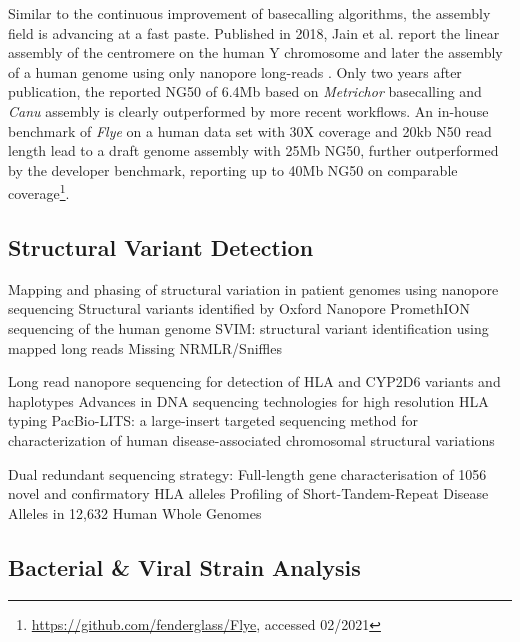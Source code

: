 Similar to the continuous improvement of basecalling algorithms, the assembly field is advancing at a fast paste.
Published in 2018, Jain et al. report the linear assembly of the centromere on the human Y chromosome and later the assembly of a human genome using only nanopore long-reads \cite{Jain2018, Jain2018b}.
Only two years after publication, the reported NG50 of 6.4Mb based on \textit{Metrichor} basecalling and \textit{Canu} assembly is clearly outperformed by more recent workflows.
An in-house benchmark of \textit{Flye} on a human data set with 30X coverage and 20kb N50 read length lead to a draft genome assembly with 25Mb NG50, further outperformed by the developer benchmark, reporting up to 40Mb NG50 on comparable coverage\footnote{\url{https://github.com/fenderglass/Flye}, accessed 02/2021}.




\subsection{Structural Variant Detection}
\label{subsec:state_of_art:sv}

Mapping and phasing of structural variation in patient genomes using nanopore sequencing \cite{Stancu2017}
Structural variants identified by Oxford Nanopore PromethION sequencing of the human genome \cite{Coster2019}
SVIM: structural variant identification using mapped long reads \cite{Heller2019}
Missing NRMLR/Sniffles \cite{Sedlazeck2018}

Long read nanopore sequencing for detection of HLA and CYP2D6 variants and haplotypes \cite{Ammar2015}
Advances in DNA sequencing technologies for high resolution HLA typing \cite{Cereb2015}
PacBio-LITS: a large-insert targeted sequencing method for characterization of human disease-associated chromosomal structural variations \cite{Wang2015}

Dual redundant sequencing strategy: Full-length gene characterisation of 1056 novel and confirmatory HLA alleles \cite{Albrecht2017}
Profiling of Short-Tandem-Repeat Disease Alleles in 12,632 Human Whole Genomes \cite{Tang2017}




\subsection{Bacterial \& Viral Strain Analysis}
\label{subsec:state_of_art:strain}

